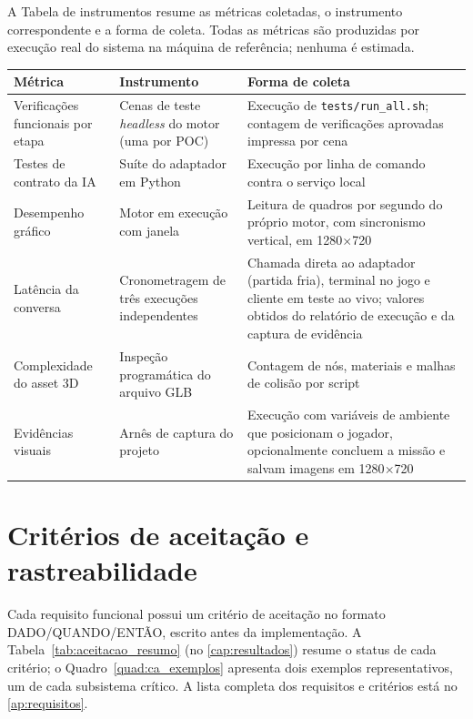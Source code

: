 A Tabela de instrumentos resume as métricas coletadas, o instrumento
correspondente e a forma de coleta. Todas as métricas são produzidas por
execução real do sistema na máquina de referência; nenhuma é estimada.

\begin{quadro}[htbp]
\centering
\caption{Instrumentos de avaliação e métricas coletadas.}
\label{quad:instrumentos}
\footnotesize
\begin{tabular}{@{}>{\raggedright\arraybackslash}p{3.6cm} >{\raggedright\arraybackslash}p{4.2cm} >{\raggedright\arraybackslash}p{5.4cm}@{}}
\toprule
Métrica & Instrumento & Forma de coleta \\
\midrule
Verificações funcionais por etapa & Cenas de teste \emph{headless} do motor (uma por POC) & Execução de \texttt{tests/run\_all.sh}; contagem de verificações aprovadas impressa por cena \\
Testes de contrato da IA & Suíte do adaptador em Python & Execução por linha de comando contra o serviço local \\
Desempenho gráfico & Motor em execução com janela & Leitura de quadros por segundo do próprio motor, com sincronismo vertical, em 1280$\times$720 \\
Latência da conversa & Cronometragem de três execuções independentes & Chamada direta ao adaptador (partida fria), terminal no jogo e cliente em teste ao vivo; valores obtidos do relatório de execução e da captura de evidência \\
Complexidade do asset 3D & Inspeção programática do arquivo GLB & Contagem de nós, materiais e malhas de colisão por script \\
Evidências visuais & Arnês de captura do projeto & Execução com variáveis de ambiente que posicionam o jogador, opcionalmente concluem a missão e salvam imagens em 1280$\times$720 \\
\bottomrule
\end{tabular}
\par\vspace{2pt}{\footnotesize Fonte: elaborado pelo autor (2026).}
\end{quadro}

\section{Critérios de aceitação e rastreabilidade}
\label{sec:criterios}

Cada requisito funcional possui um critério de aceitação no formato
DADO\slash QUANDO\slash ENTÃO, escrito antes da implementação. A
Tabela~\ref{tab:aceitacao_resumo} (no \autoref{cap:resultados}) resume o
status de cada critério; o Quadro~\ref{quad:ca_exemplos} apresenta dois
exemplos representativos, um de cada subsistema crítico. A lista completa dos
requisitos e critérios está no \autoref{ap:requisitos}.

